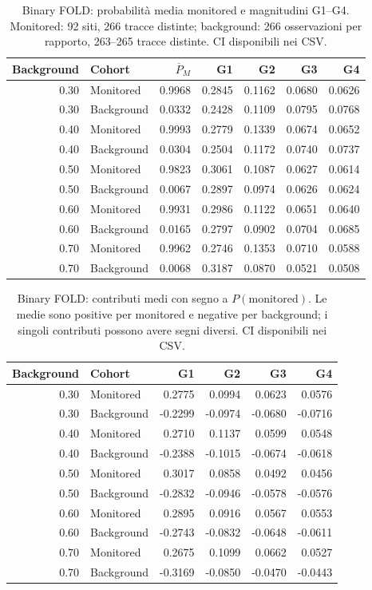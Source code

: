 \documentclass[11pt,a4paper]{article}
\begin{document}
\begin{table}[htbp]
\centering\footnotesize
\caption{Binary FOLD: probabilità media monitored e magnitudini G1--G4. Monitored: 92 siti, 266 tracce distinte; background: 266 osservazioni per rapporto, 263--265 tracce distinte. CI disponibili nei CSV.}
\label{tab:crossrun-open-binary-abs}
\begin{tabular}{rlrrrrr}
\toprule
Background & Cohort & $\overline P_M$ & G1 & G2 & G3 & G4 \\
\midrule
0.30 & Monitored & 0.9968 & 0.2845 & 0.1162 & 0.0680 & 0.0626 \\
0.30 & Background & 0.0332 & 0.2428 & 0.1109 & 0.0795 & 0.0768 \\
0.40 & Monitored & 0.9993 & 0.2779 & 0.1339 & 0.0674 & 0.0652 \\
0.40 & Background & 0.0304 & 0.2504 & 0.1172 & 0.0740 & 0.0737 \\
0.50 & Monitored & 0.9823 & 0.3061 & 0.1087 & 0.0627 & 0.0614 \\
0.50 & Background & 0.0067 & 0.2897 & 0.0974 & 0.0626 & 0.0624 \\
0.60 & Monitored & 0.9931 & 0.2986 & 0.1122 & 0.0651 & 0.0640 \\
0.60 & Background & 0.0165 & 0.2797 & 0.0902 & 0.0704 & 0.0685 \\
0.70 & Monitored & 0.9962 & 0.2746 & 0.1353 & 0.0710 & 0.0588 \\
0.70 & Background & 0.0068 & 0.3187 & 0.0870 & 0.0521 & 0.0508 \\
\bottomrule
\end{tabular}
\end{table}
\begin{table}[htbp]
\centering\footnotesize
\caption{Binary FOLD: contributi medi con segno a $P(\mathrm{monitored})$. Le medie sono positive per monitored e negative per background; i singoli contributi possono avere segni diversi. CI disponibili nei CSV.}
\label{tab:crossrun-open-binary-signed}
\begin{tabular}{rlrrrr}
\toprule
Background & Cohort & G1 & G2 & G3 & G4 \\
\midrule
0.30 & Monitored & 0.2775 & 0.0994 & 0.0623 & 0.0576 \\
0.30 & Background & -0.2299 & -0.0974 & -0.0680 & -0.0716 \\
0.40 & Monitored & 0.2710 & 0.1137 & 0.0599 & 0.0548 \\
0.40 & Background & -0.2388 & -0.1015 & -0.0674 & -0.0618 \\
0.50 & Monitored & 0.3017 & 0.0858 & 0.0492 & 0.0456 \\
0.50 & Background & -0.2832 & -0.0946 & -0.0578 & -0.0576 \\
0.60 & Monitored & 0.2895 & 0.0916 & 0.0567 & 0.0553 \\
0.60 & Background & -0.2743 & -0.0832 & -0.0648 & -0.0611 \\
0.70 & Monitored & 0.2675 & 0.1099 & 0.0662 & 0.0527 \\
0.70 & Background & -0.3169 & -0.0850 & -0.0470 & -0.0443 \\
\bottomrule
\end{tabular}
\end{table}
\end{document}
